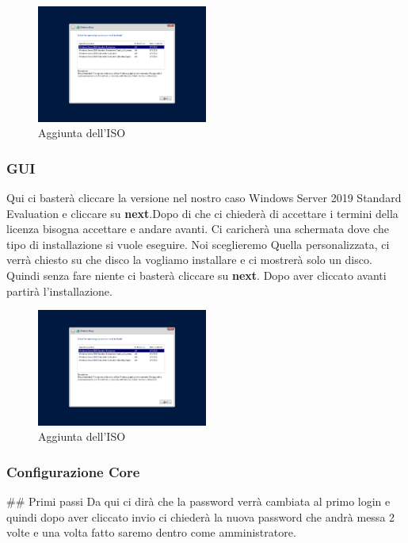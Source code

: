 \documentclass[../main.tex]{subfiles}
\begin{document}
\begin{figure}[h]
    \centering
    \includegraphics[width=0.5\textwidth]{Images/conf2en.PNG}
    \caption{Aggiunta dell'ISO}
\end{figure}



\subsubsection{GUI}
Qui ci basterà cliccare la versione nel nostro caso Windows Server 2019 Standard Evaluation e cliccare su \textbf{next}.Dopo di che ci chiederà di accettare i termini della licenza bisogna accettare e andare avanti. Ci caricherà una schermata dove che tipo di installazione si vuole eseguire. Noi sceglieremo Quella personalizzata, ci verrà chiesto su che disco la vogliamo installare e ci mostrerà solo un disco. Quindi senza fare niente ci basterà cliccare su \textbf{next}. Dopo aver cliccato avanti partirà l'installazione. 


\begin{figure}[h]
    \centering
    \includegraphics[width=0.5\textwidth]{Images/conf2en.PNG}
    \caption{Aggiunta dell'ISO}
\end{figure}


\subsubsection{Configurazione Core}
## Primi passi
Da qui ci dirà che la password verrà cambiata al primo login e quindi dopo aver cliccato invio ci chiederà la nuova password che andrà messa 2 volte e una volta fatto saremo dentro come amministratore.
\end{document}
